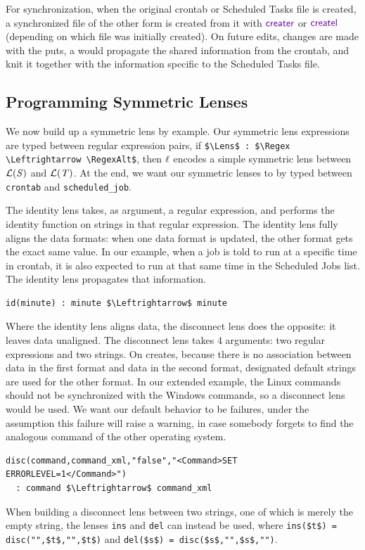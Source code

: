 \documentclass[acmsmall,screen,anonymous]{acmart}
\begin{document}
For synchronization, when the original crontab or Scheduled Tasks file is
created, a synchronized file of the other form is created from it with
$\CreateR$ or $\CreateL$ (depending on which file was initially created). On
future edits, changes are made with the puts, a \PutR would propagate the shared
information from the crontab, and knit it together with the information specific
to the Scheduled Tasks file.

\subsection{Programming Symmetric Lenses} We now build up a symmetric lens by
example. Our symmetric lens expressions are typed between regular expression
pairs, if \lstinline{$\Lens$ : $\Regex \Leftrightarrow \RegexAlt$}, then $\mathit{\ell}$
encodes a simple symmetric lens between $\mathcal{L}(\mathit{S})$ and
$\mathcal{L}(\mathit{T})$. At the end, we want our symmetric lenses to by typed
between \lstinline{crontab} and \lstinline{scheduled_job}.

The identity lens takes, as argument, a regular expression, and performs the
identity function on strings in that regular expression. The identity lens fully
aligns the data formats: when one data format is updated, the other format gets
the exact same value. In our example, when a job is told to run at a specific
time in crontab, it is also expected to run at that same time in the Scheduled
Jobs list. The identity lens propagates that information.
%
\begin{lstlisting}
id(minute) : minute $\Leftrightarrow$ minute
\end{lstlisting}
%

Where the identity lens aligns data, the disconnect lens does the opposite: it
leaves data unaligned. The disconnect lens takes 4 arguments: two regular
expressions and two strings. On creates, because there is no association between
data in the first format and data in the second format, designated default
strings are used for the other format. In our extended example, the Linux
commands should not be synchronized with the Windows commands, so a disconnect
lens would be used. We want our default behavior to be failures, under the
assumption this failure will raise a warning, in case somebody forgets to find
the analogous command of the other operating system.
%
\begin{lstlisting}
disc(command,command_xml,"false","<Command>SET ERRORLEVEL=1</Command>") 
  : command $\Leftrightarrow$ command_xml
\end{lstlisting}
%
When building a disconnect lens between two strings, one of which is merely the
empty string, the lenses \lstinline{ins} and \lstinline{del} can instead be
used, where \lstinline{ins($t$) = disc("",$t$,"",$t$)} and
\lstinline{del($s$) = disc($s$,"",$s$,"")}.
\end{document}
